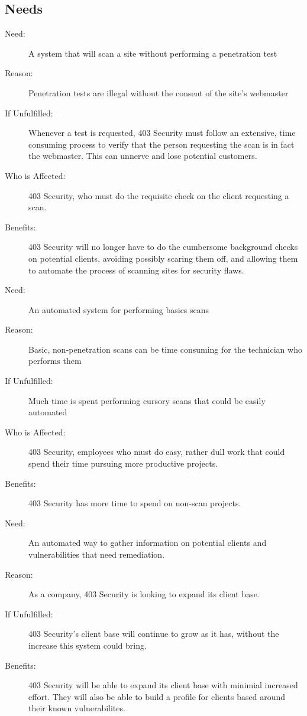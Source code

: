 \subsection{Needs}
\begin{description}
\item[Need: ]{A system that will scan a site without performing a penetration test}
\item[Reason: ]{Penetration tests are illegal without the consent of the site's webmaster}
\item[If Unfulfilled: ]{Whenever a test is requested, 403 Security must follow an extensive, time consuming process to verify that the person requesting the scan is in fact the webmaster.  This can unnerve and lose potential customers.}
\item[Who is Affected:]{403 Security, who must do the requisite check on the client requesting a scan.}
\item[Benefits:]{403 Security will no longer have to do the cumbersome background checks on potential clients, avoiding possibly scaring them off, and allowing them to automate the process of scanning sites for security flaws.}\\
\item[Need: ]{An automated system for performing basics scans}
\item[Reason: ]{Basic, non-penetration scans can be time consuming for the technician who performs them}\item[If Unfulfilled:	]{Much time is spent performing cursory scans that could be easily automated}\item[Who is Affected:	]{403 Security, employees who must do easy, rather dull work that could spend their time pursuing more productive projects.}
\item[Benefits:	]{403 Security has more time to spend on non-scan projects. }\\
\item[Need: ]{An automated way to gather information on potential clients and vulnerabilities that need remediation.}
\item[Reason:	]{As a company, 403 Security is looking to expand its client base.}
\item[If Unfulfilled:	]{403 Security's client base will continue to grow as it has, without the increase this system could bring.}
\item[Benefits: ]{403 Security will be able to expand its client base with minimial increased effort.  They will also be able to build a profile for clients based around their known vulnerabilites.}
\end{description}

